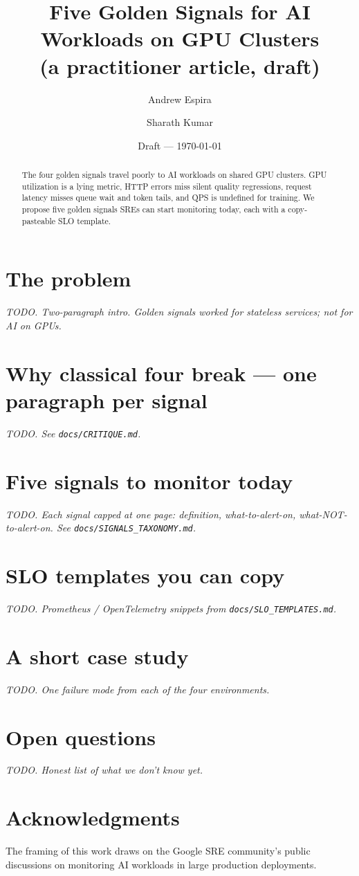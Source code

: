 \documentclass[11pt]{article}
\title{Five Golden Signals for AI Workloads on GPU Clusters\\
(a practitioner article, draft)}
\author{Andrew Espira \and Sharath Kumar}
\date{Draft --- \today}
\begin{document}
\maketitle

\begin{abstract}
The four golden signals travel poorly to AI workloads on shared GPU
clusters. GPU utilization is a lying metric, HTTP errors miss silent
quality regressions, request latency misses queue wait and token tails,
and QPS is undefined for training. We propose five golden signals SREs
can start monitoring today, each with a copy-pasteable SLO template.
\end{abstract}

\section{The problem}
\emph{TODO. Two-paragraph intro. Golden signals worked for stateless
services; not for AI on GPUs.}

\section{Why classical four break --- one paragraph per signal}
\emph{TODO. See \texttt{docs/CRITIQUE.md}.}

\section{Five signals to monitor today}
\emph{TODO. Each signal capped at one page: definition,
what-to-alert-on, what-NOT-to-alert-on. See
\texttt{docs/SIGNALS\_TAXONOMY.md}.}

\section{SLO templates you can copy}
\emph{TODO. Prometheus / OpenTelemetry snippets from
\texttt{docs/SLO\_TEMPLATES.md}.}

\section{A short case study}
\emph{TODO. One failure mode from each of the four environments.}

\section{Open questions}
\emph{TODO. Honest list of what we don't know yet.}

\section*{Acknowledgments}
The framing of this work draws on the Google SRE community's public
discussions on monitoring AI workloads in large production
deployments.
\end{document}
